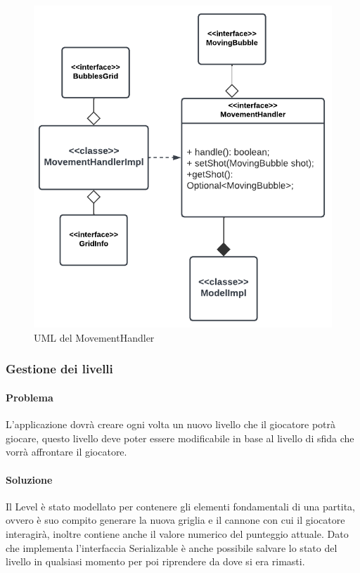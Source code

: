\documentclass[a4paper,12pt]{report}
\begin{document}
\begin{figure}[H]
	\centering{}
	\includegraphics[width=.7\textwidth]{img/movementhandler.pdf}
	\caption{UML del MovementHandler}
\end{figure}

\subsubsection{Gestione dei livelli}

\paragraph{Problema} L'applicazione dovrà creare ogni volta un nuovo livello che il giocatore potrà giocare, questo livello deve poter essere modificabile in base al livello di sfida che vorrà affrontare
il giocatore. 

\paragraph{Soluzione} Il Level è stato modellato per contenere gli elementi fondamentali di una partita, ovvero è suo compito generare la nuova griglia e il cannone con cui il giocatore interagirà,
inoltre contiene anche il valore numerico del punteggio attuale. Dato che implementa l'interfaccia Serializable è anche possibile salvare lo stato del livello in
qualsiasi momento per poi riprendere da dove si era rimasti.
\end{document}
